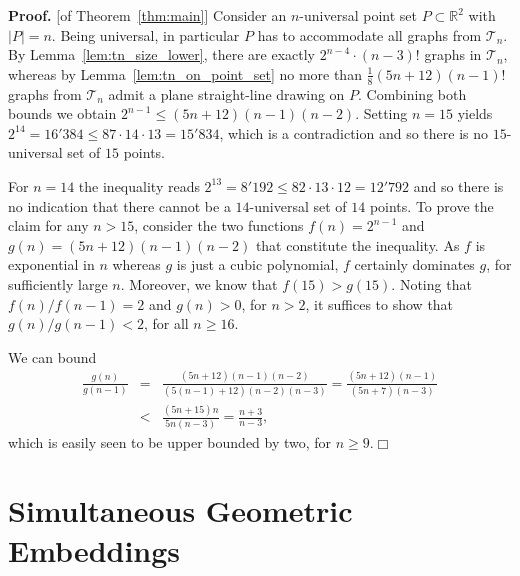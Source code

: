 \documentclass[11pt]{article}
\newcommand{\qed}{\hfill\ensuremath{\Box}}
\newenvironment{proof}{\noindent\textbf{Proof.}
}{\par\medskip}
\newcommand{\R}{\ensuremath{\mathds R}}
\newcommand{\T}{\ensuremath{\mathcal T}}
\begin{document}
\begin{proof}[of Theorem~\ref{thm:main}]
  Consider an $n$-universal point set $P\subset\R^2$ with
  $|P|=n$. Being universal, in particular $P$ has to accommodate all
  graphs from $\T_n$. By Lemma~\ref{lem:tn_size_lower}, there are
  exactly $2^{n-4}\cdot (n-3)!$ graphs in $\T_n$, whereas by
  Lemma~\ref{lem:tn_on_point_set} no more than
  $\frac{1}{8}(5n+12)(n-1)!$ graphs from $\T_n$ admit a plane
  straight-line drawing on $P$. Combining both bounds we obtain
  $2^{n-1}\le(5n+12)(n-1)(n-2)$. Setting $n=15$ yields
  $2^{14}=16'384\le 87\cdot 14\cdot 13=15'834$, which is a
  contradiction and so there is no $15$-universal set of $15$ points.

  For $n=14$ the inequality reads $2^{13}=8'192\le 82\cdot 13\cdot
  12=12'792$ and so there is no indication that there cannot be a
  $14$-universal set of $14$ points. To prove the claim for any
  $n>15$, consider the two functions $f(n)=2^{n-1}$ and
  $g(n)=(5n+12)(n-1)(n-2)$ that constitute the inequality. As $f$ is
  exponential in $n$ whereas $g$ is just a cubic polynomial, $f$
  certainly dominates $g$, for sufficiently large $n$.  Moreover, we
  know that $f(15)>g(15)$. Noting that $f(n)/f(n-1)=2$ and $g(n)>0$,
  for $n>2$, it suffices to show that $g(n)/g(n-1)<2$, for all $n\ge
  16$.  

  \noindent We can bound
  \begin{eqnarray*}
    \frac{g(n)}{g(n-1)} &=&
    \frac{(5n+12)(n-1)(n-2)}{(5(n-1)+12)(n-2)(n-3)}=
    \frac{(5n+12)(n-1)}{(5n+7)(n-3)}\\
    &<& \frac{(5n+15)n}{5n(n-3)}=\frac{n+3}{n-3},
  \end{eqnarray*}
  which is easily seen to be upper bounded by two, for $n\geq 9$.\qed
\end{proof}

\section{Simultaneous Geometric Embeddings}
\label{sec:sim}
\end{document}

